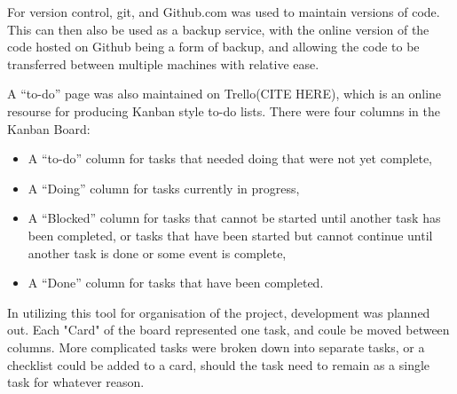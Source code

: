 For version control, git, and Github.com was used to maintain versions of code. This can then also be used as a backup service, with the online version of the code hosted on Github being a form of backup, and allowing the code to be transferred between multiple machines with relative ease.

 A “to-do” page was also maintained on Trello(CITE HERE), which is an online resourse for producing Kanban style to-do lists. There were four columns in the Kanban Board: 
\begin{itemize}
	\item A “to-do” column for tasks that needed doing that were not yet complete, 
	\item A  “Doing” column for tasks currently in progress, 
	\item A “Blocked” column for tasks that cannot be started until another task has been completed, or tasks that have been started but cannot continue until another task is done or some event is complete,
	\item A “Done” column for tasks that have been completed.
\end{itemize}

In utilizing this tool for organisation of the project, development was planned out. Each "Card" of the board represented one task, and coule be moved between columns. More complicated tasks were broken down into separate tasks, or a checklist could be added to a card, should the task need to remain as a single task for whatever reason.
